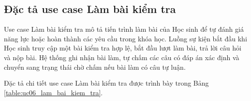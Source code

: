 ﻿\documentclass[../DoAn.tex]{subfiles}
\begin{document}
\subsection{Đặc tả use case Làm bài kiểm tra}
\label{subsection:2.3.6}

Use case Làm bài kiểm tra mô tả tiến trình làm bài của Học sinh để tự đánh giá năng lực hoặc hoàn thành các yêu cầu trong khóa học. Luồng sự kiện bắt đầu khi Học sinh truy cập một bài kiểm tra hợp lệ, bắt đầu lượt làm bài, trả lời câu hỏi và nộp bài. Hệ thống ghi nhận bài làm, tự chấm các câu có đáp án xác định và chuyển sang trạng thái chờ chấm nếu bài làm có câu tự luận.

Đặc tả chi tiết use case Làm bài kiểm tra được trình bày trong Bảng \ref{table:uc06_lam_bai_kiem_tra}.

\begingroup
\small
\renewcommand{\arraystretch}{1.15}
\setlength{\LTpre}{0pt}
\setlength{\LTpost}{0pt}
\end{document}
